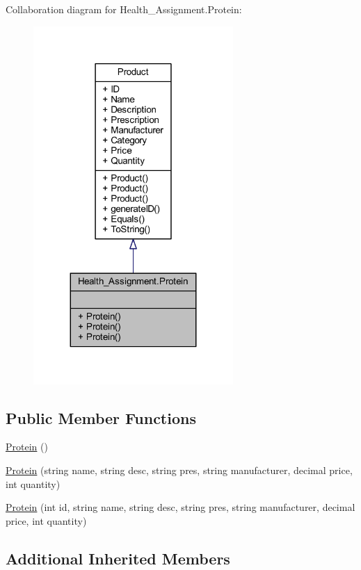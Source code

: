 Collaboration diagram for Health\+\_\+\+Assignment.\+Protein\+:\nopagebreak
\begin{figure}[H]
\begin{center}
\leavevmode
\includegraphics[width=215pt]{class_health___assignment_1_1_protein__coll__graph}
\end{center}
\end{figure}
\subsection*{Public Member Functions}
\begin{DoxyCompactItemize}
\item 
\hyperlink{class_health___assignment_1_1_protein_a82d41b2de005a9cc799de7272dec50c5}{Protein} ()
\item 
\hyperlink{class_health___assignment_1_1_protein_a251b7fbc933c184e8525323a93f5dcea}{Protein} (string name, string desc, string pres, string manufacturer, decimal price, int quantity)
\item 
\hyperlink{class_health___assignment_1_1_protein_ac8135b3e5cfcdbaa7a25de806dbfb383}{Protein} (int id, string name, string desc, string pres, string manufacturer, decimal price, int quantity)
\end{DoxyCompactItemize}
\subsection*{Additional Inherited Members}


